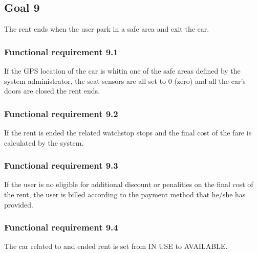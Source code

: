 \subsection{Goal 9}
The rent ends when the user park in a safe area and exit the car.

\setcounter{secnumdepth}{3}
\subsubsection{Functional requirement 9.1}
If the GPS location of the car is whitin one of the safe areas defined by the system administrator, the seat sensors are all set to 0 (zero) and all the car's doors are closed the rent ends.

\subsubsection{Functional requirement 9.2}
If the rent is ended the related watchstop stops and the final cost of the fare is calculated by the system.

\subsubsection{Functional requirement 9.3}
If the user is no eligible for additional discount or penalities on the final cost of the rent, the user is billed according to the payment method that he/she has provided.

\subsubsection{Functional requirement 9.4}
The car related to and ended rent is set from IN USE to AVAILABLE.
